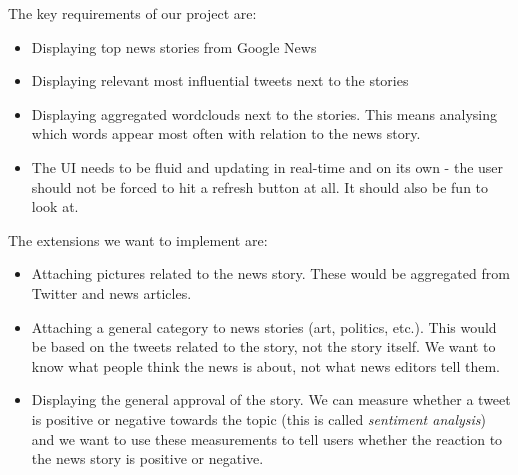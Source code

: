 \documentclass[a4paper,12pt]{article}
\begin{document}
  The key requirements of our project are:
  \begin{itemize}
   \item Displaying top news stories from Google News
   \item Displaying relevant most influential tweets next to the stories
   \item Displaying aggregated wordclouds next to the stories. This means analysing which words appear most often with relation to the news story.
   \item The UI needs to be fluid and updating in real-time and on its own - the user should not be forced to hit a refresh button at all. It should also be fun to look at.
  \end{itemize}

  The extensions we want to implement are:
  \begin{itemize}
   \item Attaching pictures related to the news story. These would be aggregated from Twitter and news articles.
   \item Attaching a general category to news stories (art, politics, etc.). This would be based on the tweets related to the story, not the story itself. We want to know what people think the news is about, not what news editors tell them.
   \item Displaying the general approval of the story. We can measure whether a tweet is positive or negative towards the topic (this is called \emph{sentiment analysis}) and we want to use these measurements to tell users whether the reaction to the news story is positive or negative.
  \end{itemize}
\end{document}
